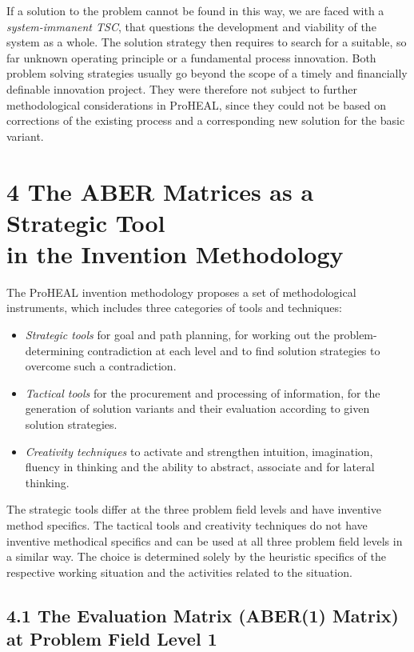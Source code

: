 \documentclass[12pt,a4paper]{article}
\begin{document}
If a solution to the problem cannot be found in this way, we are faced with a
\emph{system-immanent TSC}, that questions the development and viability of
the system as a whole. The solution strategy then requires to search for a
suitable, so far unknown operating principle or a fundamental process
innovation. Both problem solving strategies usually go beyond the scope of a
timely and financially definable innovation project. They were therefore not
subject to further methodological considerations in ProHEAL, since they could
not be based on corrections of the existing process and a corresponding new
solution for the basic variant.

\section*{4 The ABER Matrices as a Strategic Tool\\ in the Invention
  Methodology}

The ProHEAL invention methodology proposes a set of methodological
instruments, which includes three categories of tools and techniques:
\begin{itemize}
\item \emph{Strategic tools} for goal and path planning, for working out the
  problem-determining contradiction at each level and to find solution
  strategies to overcome such a contradiction. 
\item \emph{Tactical tools} for the procurement and processing of information,
  for the generation of solution variants and their evaluation according to
  given solution strategies.
\item \emph{Creativity techniques} to activate and strengthen intuition,
  imagination, fluency in thinking and the ability to abstract, associate and
  for lateral thinking.
\end{itemize}

The strategic tools differ at the three problem field levels and have
inventive method specifics.  The tactical tools and creativity techniques do
not have inventive methodical specifics and can be used at all three problem
field levels in a similar way. The choice is determined solely by the
heuristic specifics of the respective working situation and the activities
related to the situation.

\subsection*{4.1 The Evaluation Matrix (ABER(1) Matrix)\\ at Problem Field
  Level 1}
\end{document}
